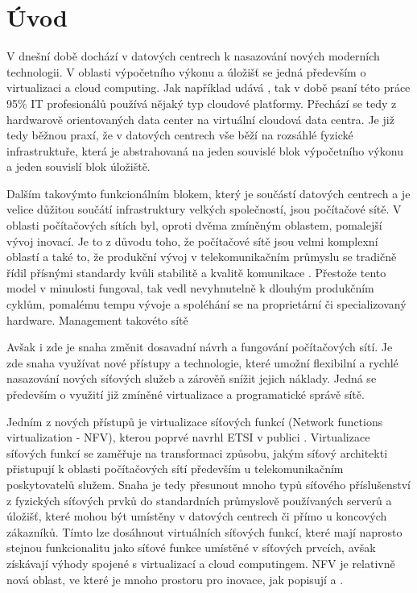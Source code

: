 
\chapter{Úvod}

V dnešní době dochází v datových centrech k nasazování nových moderních technologii. V oblasti výpočetního výkonu a úložišť se jedná především o virtualizaci a cloud computing. Jak například udává \cite{Cloud_adoption} , tak v době psaní této práce 95\% IT profesionálů používá nějaký typ cloudové platformy. Přechází se tedy z hardwarově orientovaných data center na virtuální cloudová data centra. Je již tedy běžnou praxí, že v datových centrech vše běží na rozsáhlé fyzické infrastruktuře, která je abstrahovaná na jeden souvislé blok výpočetního výkonu a jeden souvislí blok úložiště.

Dalším takovýmto funkcionálním blokem, který je součástí datových centrech a je velice důžitou součátí infrastruktury velkých společností, jsou počítačové sítě. V oblasti počítačových sítích byl, oproti dvěma zmíněným oblastem, pomalejší vývoj inovací. Je to z důvodu toho, že počítačové sítě jsou velmi komplexní oblastí a také to, že produkční vývoj v telekomunikačním průmyslu se tradičně řídil přísnými standardy kvůli stabilitě a kvalitě komunikace \cite{telco} . Přestože tento model v minulosti fungoval, tak vedl nevyhnutelně k dlouhým produkčním cyklům, pomalému tempu vývoje a spoléhání se na proprietární či specializovaný hardware. Management takovéto sítě 

Avšak i zde je snaha změnit dosavadní návrh a fungování počítačových sítí. Je zde snaha využívat nové přístupy a technologie, které umožní flexibilní a rychlé nasazování nových síťových služeb a zárověň snížit jejich náklady. Jedná se především o využití již zmíněné virtualizace a programatické správě sítě. \cite{Toward_Unified}

Jedním z nových přístupů je virtualizace síťových funkcí (Network functions virtualization - NFV), kterou poprvé navrhl ETSI v publici \cite{NFV_paper2012} . Virtualizace síťových funkcí se zaměřuje na transformaci způsobu, jakým síťový architekti přistupují k oblasti počítačových sítí především u telekomunikačním poskytovatelů služem. Snaha je tedy přesunout mnoho typů síťového příslušenství z fyzických síťových prvků do standardních průmyslově používaných serverů a úložišť, které mohou být umístěny v datových centrech či přímo u koncových zákazníků. Tímto lze dosáhnout virtuálních síťových funkcí, které mají naprosto stejnou funkcionalitu jako síťové funkce umístěné v síťových prvcích, avšak získávají výhody spojené s virtualizací a cloud computingem. NFV je relativně nová oblast, ve které je mnoho prostoru pro inovace, jak popisují \cite{NFVChalanges} a \cite{NFVState}. 

